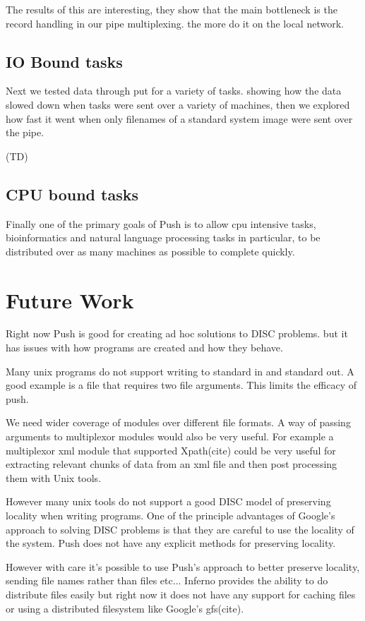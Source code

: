 \documentclass[11pt, letterpaper]{article}
\begin{document}
The results of this are interesting, they show that the main bottleneck is the record handling in our pipe multiplexing. the more 
do it on the local network. 

\subsection{IO Bound tasks}

Next we tested data through put for a variety of tasks. showing how the data slowed down when tasks were sent over a variety of machines, then we explored how fast it went when only filenames of a standard system image were sent over the pipe. 


(TD)

\subsection{CPU bound tasks}

Finally one of the primary goals of Push is to allow cpu intensive tasks, bioinformatics and natural language processing tasks in particular, to be distributed over as many machines as possible to complete quickly. 

\section{Future Work}

Right now Push is good for creating ad hoc solutions to DISC problems. but it has issues with how programs are created and how they behave.

Many unix programs do not support writing to standard in and standard out. A good example is a file that requires two file arguments. This limits the efficacy of push. 

We need wider coverage of modules over different file formats. A way of passing arguments to multiplexor modules would also be very useful. For example a multiplexor xml module that supported Xpath(cite) could be very useful for extracting relevant chunks of data from an xml file and then post processing them with Unix tools. 

However many unix tools do not support a good DISC model of preserving locality when writing programs. One of the principle advantages of Google's approach to solving DISC problems is that they are careful to use the locality of the system. Push does not have any explicit methods for preserving locality.

However with care it's possible to use Push's approach to better preserve locality, sending file names rather than files etc... Inferno provides the ability to do distribute files easily but right now it does not have any support for caching files or using a distributed filesystem like Google's gfs(cite).
\end{document}
